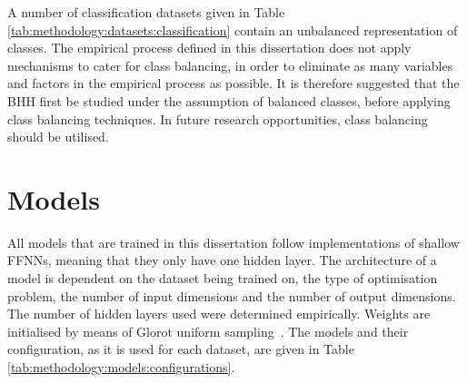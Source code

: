 A number of classification datasets given in Table \ref{tab:methodology:datasets:classification} contain an unbalanced representation of classes. The empirical process defined in this dissertation does not apply mechanisms to cater for class balancing, in order to eliminate as many variables and factors in the empirical process as possible. It is therefore suggested that the \acs{BHH} first be studied under the assumption of balanced classes, before applying class balancing techniques. In future research opportunities, class balancing should be utilised.

\section{Models}\label{sec:methodology:model}

All models that are trained in this dissertation follow implementations of shallow \acp{FFNN}, meaning that they only have one hidden layer. The architecture of a model is dependent on the dataset being trained on, the type of optimisation problem, the number of input dimensions and the number of output dimensions. The number of hidden layers used were determined empirically. Weights are initialised by means of Glorot uniform sampling~\cite{ref:glorot:2010}. The models and their configuration, as it is used for each dataset, are given in Table \ref{tab:methodology:models:configurations}.

